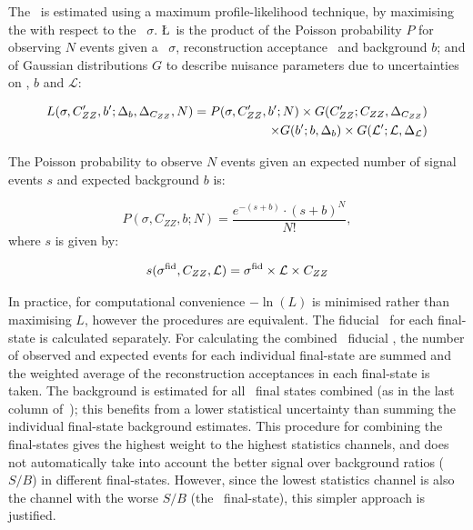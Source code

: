 The \cx\ is estimated using a maximum profile-likelihood technique, by
maximising the  with respect to the \cx\
$\sigma$.
\L\ is the product of the Poisson probability $P$ for observing $N$ events given a
\cx\ $\sigma$, reconstruction acceptance \CZZ\ and background $b$; and of Gaussian
distributions $G$ to describe nuisance parameters due to uncertainties on \CZZ,
$b$ and $\mathcal{L}$:

\begin{equation}
\begin{split}
   L(\sigma, C_{ZZ}', b'; \Delta_{b}, \Delta_{C_{ZZ}}, N) = P(\sigma, C_{ZZ}^\prime,
   b^\prime; N)\times G(C_{ZZ}^\prime; C_{ZZ}, \Delta_{C_{ZZ}}) \\
   \times G(b^\prime; b, \Delta_{b})
\times G(\mathcal{L}^\prime; \mathcal{L}, \Delta_{\mathcal{L}})
\end{split}
\end{equation}

The Poisson probability to observe $N$ events given an expected
number of signal events $s$ and expected background $b$ is:

\begin{equation}
P(\sigma, C_{ZZ}, b; N) =
\frac{e^{-(s+b)}\cdot
     \left(s+b\right)^{N}}
     {N!},
\end{equation}
where $s$ is given by:

\begin{equation}
   s(\sigma^{\rm fid}, C_{ZZ}, \mathcal{L}) = \sigma^{\rm fid}\times\mathcal{L}\times C_{ZZ} \\
\end{equation}

In practice, for computational convenience $-\ln(L)$ is minimised rather
than maximising $L$, however the procedures are equivalent. The fiducial
\cx\ for each final-state is calculated separately. For calculating the combined \ZZllll\
fiducial \cx, the number of observed and expected events for each individual
final-state are summed and the weighted average of the reconstruction
acceptances in each final-state is taken. 
The background is estimated for all \llll\ final states combined (as in the last
column of~); this benefits from a
lower statistical uncertainty than summing the individual final-state background
estimates. 
This procedure for combining the final-states gives the highest weight to the highest
statistics channels, and does not automatically take into account the better
signal over background ratios ($S/B$) in different final-states. However, since the
lowest statistics channel is also the channel with the worse $S/B$ (the \eeee\
final-state), this simpler approach is justified.

